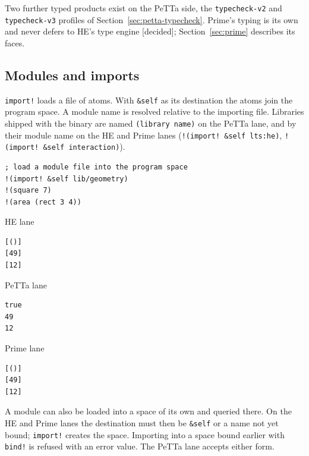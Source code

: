\documentclass[11pt]{article}
\newcommand{\code}[1]{\texttt{#1}}
\newcommand{\outhead}[1]{{\footnotesize\sffamily #1}\par\vspace{1pt}}
\newcommand{\kind}[1]{\textsf{\small[#1]}}
\newcommand{\PeTTa}{\textup{PeTTa}}
\newcommand{\HE}{\textup{HE}}
\begin{document}
\noindent
Two further typed products exist on the \PeTTa{} side, the
\code{typecheck-v2} and \code{typecheck-v3} profiles of
Section~\ref{sec:petta-typecheck}.  Prime's typing is its own and never
defers to \HE{}'s type engine \kind{decided}; Section~\ref{sec:prime}
describes its faces.

\subsection{Modules and imports}
\label{sec:tut-modules}

\code{import!} loads a file of atoms.  With \code{\&self} as its destination
the atoms join the program space.  A module name is resolved relative to the
importing file.  Libraries shipped with the binary are named
\code{(library name)} on the \PeTTa{} lane, and by their module name on the
\HE{} and Prime lanes (\code{!(import! \&self lts:he)},
\code{!(import! \&self interaction)}).

\begin{lstlisting}[style=metta,caption={Importing a module file},label={lst:t06}]
; load a module file into the program space
!(import! &self lib/geometry)
!(square 7)
!(area (rect 3 4))
\end{lstlisting}
\noindent\begin{minipage}[t]{0.32\textwidth}
\outhead{HE lane}
\begin{lstlisting}[style=out]
[()]
[49]
[12]
\end{lstlisting}
\end{minipage}\hfill
\begin{minipage}[t]{0.32\textwidth}
\outhead{PeTTa lane}
\begin{lstlisting}[style=out]
true
49
12
\end{lstlisting}
\end{minipage}\hfill
\begin{minipage}[t]{0.32\textwidth}
\outhead{Prime lane}
\begin{lstlisting}[style=out]
[()]
[49]
[12]
\end{lstlisting}
\end{minipage}

\noindent
A module can also be loaded into a space of its own and queried there.  On the
\HE{} and Prime lanes the destination must then be \code{\&self} or a name not
yet bound; \code{import!} creates the space.  Importing into a space bound
earlier with \code{bind!} is refused with an error value.  The \PeTTa{} lane
accepts either form.
\end{document}

